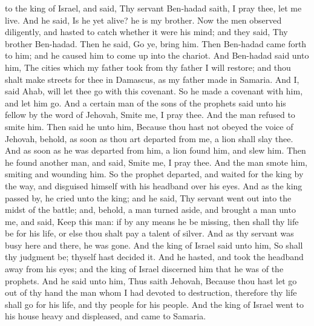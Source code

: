 to the king of Israel, and said, Thy servant Ben-hadad saith, I pray thee, let me live. And he said, Is he yet alive? he is my brother. Now the men observed diligently, and hasted to catch whether it were his mind; and they said, Thy brother Ben-hadad. Then he said, Go ye, bring him. Then Ben-hadad came forth to him; and he caused him to come up into the chariot. And Ben-hadad said unto him, The cities which my father took from thy father I will restore; and thou shalt make streets for thee in Damascus, as my father made in Samaria. And I, said Ahab, will let thee go with this covenant. So he made a covenant with him, and let him go.  And a certain man of the sons of the prophets said unto his fellow by the word of Jehovah, Smite me, I pray thee. And the man refused to smite him. Then said he unto him, Because thou hast not obeyed the voice of Jehovah, behold, as soon as thou art departed from me, a lion shall slay thee. And as soon as he was departed from him, a lion found him, and slew him. Then he found another man, and said, Smite me, I pray thee. And the man smote him, smiting and wounding him. So the prophet departed, and waited for the king by the way, and disguised himself with his headband over his eyes. And as the king passed by, he cried unto the king; and he said, Thy servant went out into the midst of the battle; and, behold, a man turned aside, and brought a man unto me, and said, Keep this man: if by any means he be missing, then shall thy life be for his life, or else thou shalt pay a talent of silver. And as thy servant was busy here and there, he was gone. And the king of Israel said unto him, So shall thy judgment be; thyself hast decided it. And he hasted, and took the headband away from his eyes; and the king of Israel discerned him that he was of the prophets. And he said unto him, Thus saith Jehovah, Because thou hast let go out of thy hand the man whom I had devoted to destruction, therefore thy life shall go for his life, and thy people for his people. And the king of Israel went to his house heavy and displeased, and came to Samaria. 

